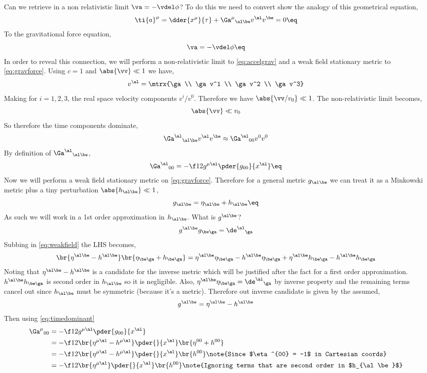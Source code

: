 \documentclass{article}
\begin{document}
Can we retrieve in a non relativistic limit $\va = - \vdel \phi$? To do this we need to convert show the analogy of this geometrical equation,
\[ \ti{a}^\mu = \dder{x^\mu}{\tau} + {\Ga^{\mu}}_{\al\be} v^\al v^\be = 0 \eq \label{eq:accelgrav} \]
To the gravitational force equation,
\[ \va = - \vdel \phi \eq \label{eq:gravforce}\]
In order to reveal this connection, we will perform a non-relativistic limit to \eqref{eq:accelgrav} and a weak field stationary metric to \eqref{eq:gravforce}. Using $c=1$ and $\abs{\vv} \ll 1$ we have,
\[ v^\al = \mtrx{\ga \\ \ga v^1 \\ \ga v^2 \\ \ga v^3} \]
Making for $i = 1,2,3$, the real space velocity components $v^i/v^0$. Therefore we have $\abs{\vv/v_0} \ll 1$. The non-relativistic limit becomes,
\[ \abs{\vv} \ll v_0 \]
So therefore the time components dominate,
\[ {\Ga^\al}_{\al\be}v^\al v^\be \approx {\Ga^\al}_{00}v^0 v^0 \]
By definition of ${\Ga^\al}_{\al\be}$,
\[ {\Ga^\al}_{00} = -\f12 g^{\mu\al} \pder{g_{00}}{x^\al}  \eq \label{eq:timedominant}\]
Now we will perform a weak field stationary metric on \eqref{eq:gravforce}. Therefore for a general metric $g_{\al\be}$ we can treat it as a Minkowski metric plus a tiny perturbation $\abs{h_{\al\be}} \ll 1$,
\[ g_{\al\be} = \eta_{\al\be} + h_{\al\be} \eq \label{eq:weakfield} \]
As such we will work in a 1st order approximation in $h_{\al\be}$. What is $g^{\al\be}$?
\[ g^{\al\be}g_{\be\ga} = {\de^{\al}}_\ga \]
Subbing in \eqref{eq:weakfield} the LHS becomes,
\[ \br{\eta^{\al\be} - h^{\al\be}}\br{\eta_{\be\ga} + h_{\be\ga}} = \eta^{\al\be}\eta_{\be\ga} - h^{\al\be}\eta_{\be\ga} + \eta^{\al\be}h_{\be\ga} - h^{\al\be}h_{\be\ga} \]
Noting that $\eta^{\al\be} - h^{\al\be}$ is a candidate for the inverse metric which will be justified after the fact for a first order approximation. $h^{\al\be}h_{\be\ga}$ is second order in $h_{\al\be}$ so it is negligible. Also, $\eta^{\al\be}\eta_{\be\ga} = {\de^\al}_\ga$ by inverse property and the remaining terms cancel out since $h_{\al\be}$ must be symmetric (because it's a metric). Therefore out inverse candidate is given by the assumed,
\[ g^{\al\be} = \eta^{\al\be} - h^{\al\be} \]
Then using \eqref{eq:timedominant}
\begin{align*}
{\Ga^\mu}_{00} &= -\f12 g^{\mu\al} \pder{g_{00}}{x^\al}\\
&= -\f12 \br{\eta^{\mu\al} - h^{\mu\al}} \pder{}{x^\al}\br{\eta^{00} + h^{00}}\\
&= -\f12 \br{\eta^{\mu\al} - h^{\mu\al}} \pder{}{x^\al}\br{h^{00}} \note{Since $\eta^{00} = -1$ in Cartesian coords}\\
&= -\f12 \br{\eta^{\mu\al}} \pder{}{x^\al}\br{h^{00}} \note{Ignoring terms that are second order in $h_{\al\be}$}\\
\end{align*}
\end{document}

